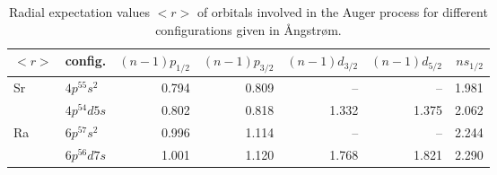 \begin{table}[h]
 \centering
 \caption{Radial expectation values $<r>$ of orbitals involved in the Auger process
          for different configurations
          given in {\AA}ngstr{\o}m.
}
 \begin{tabular}{llrrrrr}
  \toprule
   $<r>$ &     config. &   $(n-1)p_{1/2}$ & $(n-1)p_{3/2}$ & $(n-1)d_{3/2}$ & $(n-1)d_{5/2}$ & $ns_{1/2}$\\
  \midrule
   \multirow{2}{*}{Sr} & $4p^55s^2$ & 0.794 &     0.809    &      --        &        --      &  1.981\\
       &      $4p^54d5s$ &            0.802 &     0.818    &    1.332       &      1.375     &  2.062\\
   \multirow{2}{*}{Ra} & $6p^57s^2$ & 0.996 &     1.114    &      --        &        --      &  2.244\\
       &      $6p^56d7s$ &            1.001 &     1.120    &    1.768       &      1.821     &  2.290\\
  \bottomrule
 \end{tabular}
 \label{tab:widths}
\end{table}
